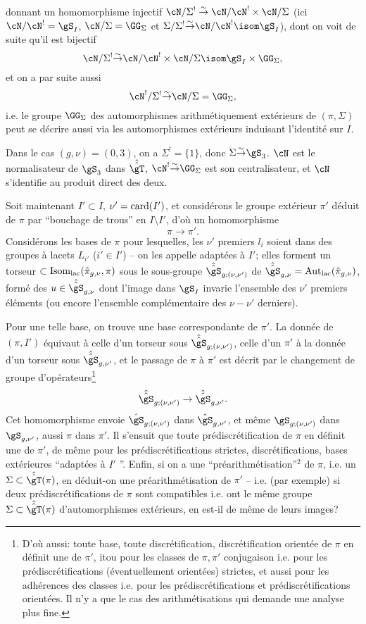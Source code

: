 donnant un homomorphisme injectif $\cN/\Sigma^!\buildrel\sim\over\to
\cN/\cN^!\times\cN/\Sigma$ (ici $\cN/\cN^!=\gS_I$,
$\cN/\Sigma=\GG_\Sigma$ et $\Sigma/\Sigma^!{\buildrel\sim \over\to}
\cN/\cN^! \isom \gS_I$), dont on voit de suite qu'il est
bijectif
$$\cN/\Sigma^!{\buildrel\sim \over\to}\cN/\cN^!\times\cN/\Sigma \isom 
\gS_I\times\GG_\Sigma,
$$
et on a par suite aussi
$$
\cN^!/\Sigma^!{\buildrel\sim \over \to} \cN/\Sigma=\GG_\Sigma,
$$
i.e. le groupe $\GG_\Sigma$ des automorphismes
arithmétiquement extérieurs de $(\pi,\Sigma)$ peut se décrire aussi via
les automorphismes extérieurs induisant l'identité sur $I$.

Dans le cas $(g,\nu)=(0,3)$, on a $\Sigma^!=\{1\}$, donc
$\Sigma{\buildrel\sim \over\to}\gS_3$.  $\cN$ est le normalisateur
de $\gS_3$ dans $\hat{\hat\gT}$, $\cN^!{\buildrel\sim\over\to}
\GG_\Sigma$ est son centralisateur, et $\cN$ s'identifie au produit
direct des deux.

Soit maintenant $I'\subset  I$, $\nu'={\rm card}(I')$, et
considérons le groupe extérieur $\pi'$ déduit
de $\pi$ par ``bouchage de trous'' en $I\setminus I'$, d'où un homomorphisme
$$\pi\to \pi'.$$
Considérons les bases de $\pi$ pour lesquelles, les $\nu'$ premiers $l_i$
soient dans des groupes à lacets $L_{i'}$ ($i'\in I'$) -- on les
appelle adaptées à $I'$; elles forment un torseur $\subset 
{\rm Isom}_{\rm lac}(\hat\pi_{g,\nu},\pi)$ sous le sous-groupe
$\hat{\hat\gS}_{g;(\nu,\nu')}$ de $\hat{\hat\gS}_{g,\nu}={\rm Aut}_{\rm lac}
(\hat\pi_{g,\nu})$, formé des $u\in\hat{\hat\gS}_{g,\nu}$ dont l'image dans 
$\gS_I$ invarie l'ensemble des $\nu'$ premiers éléments (ou encore
l'ensemble complémentaire des $\nu-\nu'$ derniers).

Pour une telle base, on trouve une base correspondante de
$\pi'$.  La donnée de $(\pi,I')$ équivaut à celle
d'un torseur sous $\hat{\hat\gS}_{g;(\nu,\nu')}$,
celle d'un $\pi'$ à la donnée d'un torseur sous
$\hat{\hat\gS}_{g,\nu'}$, et le passage de $\pi$ à $\pi'$
est décrit par le changement de groupe d'opérateurs\footnote{D'où aussi: toute base, toute
discrétification, discrétification orientée de $\pi$
en définit une de $\pi'$, itou pour les classes de $\pi, \pi'$ conjugaison 
i.e. pour les prédiscrétifications (éventuellement orientées)
strictes, et aussi pour les adhérences des classes i.e. pour
les prédiscrétifications et prédiscrétifications orientées.
Il n'y a que le cas des arithmétisations qui demande une analyse 
plus fine.}
$$\hat{\hat\gS}_{g;(\nu,\nu')}\to \hat{\hat\gS}_{g,\nu'}.
$$
Cet homomorphisme envoie $\hat\gS_{g;(\nu,\nu')}$ dans $\hat\gS_{g,\nu'}$, et 
même $\gS_{g;(\nu,\nu')}$ dans $\gS_{g,\nu'}$, aussi $\pi$ dans
$\pi'$.  Il s'ensuit que toute prédiscrétification de $\pi$
en définit une de $\pi'$, de même pour les prédiscrétifications
strictes, discrétifications, bases exté\-rieures
``adaptées à $I'$ ''.  Enfin, si on a une 
``pré\-arith\-méti\-sation''${}^2$
de $\pi$, i.e. un $\Sigma\subset \hat{\hat\gT}(\pi)$, en déduit-on
une préarithmétisation de $\pi'$ -- i.e. (par exemple) si deux
prédiscrétifications de $\pi$ sont compatibles i.e. ont
le même groupe $\Sigma\subset \hat{\hat\gT}(\pi)$ d'automorphismes
extérieurs, en est-il de même de leurs images?

